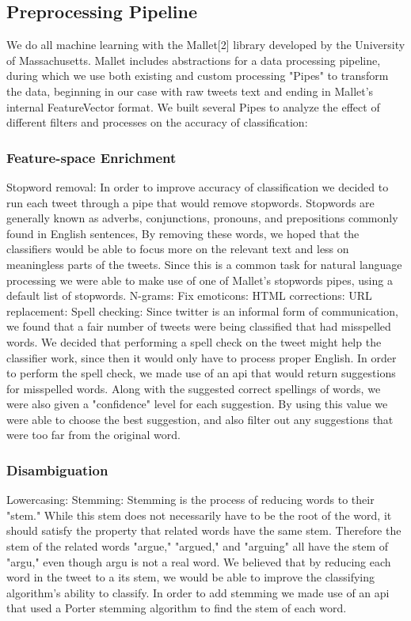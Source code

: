 \documentclass[letterpaper]{article}
\begin{document}
\subsection{Preprocessing Pipeline}

We do all machine learning with the Mallet[2] library developed by the University of Massachusetts. Mallet includes abstractions for a data processing pipeline, during which we use both existing and custom processing "Pipes" to transform the data, beginning in our case with raw tweets text and ending in Mallet's internal FeatureVector format. We built several Pipes to analyze the effect of different filters and processes on the accuracy of classification:

\subsubsection{Feature-space Enrichment}
Stopword removal: In order to improve accuracy of classification we decided to run each tweet through a pipe that would remove stopwords. Stopwords are generally known as adverbs, conjunctions, pronouns, and prepositions commonly found in English sentences, By removing these words, we hoped that the classifiers would be able to focus more on the relevant text and less on meaningless parts of the tweets. Since this is a common task for natural language processing we were able to make use of one of Mallet's stopwords pipes, using a default list of stopwords.
N-grams:
Fix emoticons:
HTML corrections: 
URL replacement:
Spell checking: Since twitter is an informal form of communication, we found that a fair number of tweets were being classified that had misspelled words. We decided that performing a spell check on the tweet might help the classifier work, since then it would only have to process proper English. In order to perform the spell check, we made use of an api that would return suggestions for misspelled words. Along with the suggested correct spellings of words, we were also given a "confidence" level for each suggestion. By using this value we were able to choose the best suggestion, and also filter out any suggestions that were too far from the original word.

\subsubsection{Disambiguation}
Lowercasing:
Stemming: Stemming is the process of reducing words to their "stem." While this stem does not necessarily have to be the root of the word, it should satisfy the property that related words have the same stem. Therefore the stem of the related words "argue," "argued," and "arguing" all have the stem of "argu," even though argu is not a real word. We believed that by reducing each word in the tweet to a its stem, we would be able to improve the classifying algorithm's ability to classify. In order to add stemming we made use of an api that used a Porter stemming algorithm to find the stem of each word.
\end{document}
